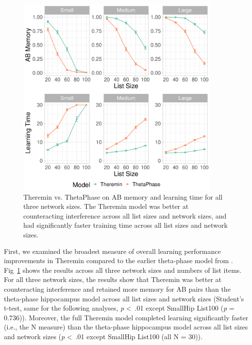 \documentclass[11pt,twoside]{article}
\newif\myifpdf
\begin{document}
\begin{figure}
  \centering\includegraphics[width=4in]{fig_hip_edl_thetaphase}
  \caption{\footnotesize Theremin vs. ThetaPhase on AB memory and learning time for all three network sizes.  The Theremin model was better at counteracting interference across all list sizes and network sizes, and had significantly faster training time across all list sizes and network sizes.}
\label{fig.thetaphase}
\end{figure}

First, we examined the broadest measure of overall learning performance improvements in Theremin compared to the earlier theta-phase model from \citet{KetzMorkondaOReilly13}.  Fig~\ref{fig.thetaphase} shows the results across all three network sizes and numbers of list items.  For all three network sizes, the results show that Theremin was better at counteracting interference and retained more memory for AB pairs than the theta-phase hippocampus model across all list sizes and network sizes (Student's t-test, same for the following analyses, \emph{p} \textless \ .01 except SmallHip List100 (\emph{p} = 0.736)). Moreover, the full Theremin model completed learning significantly faster (i.e., the N measure) than the theta-phase hippocampus model across all list sizes and network sizes (\emph{p} \textless \ .01 except SmallHip List100 (all N = 30)).
\end{document}
